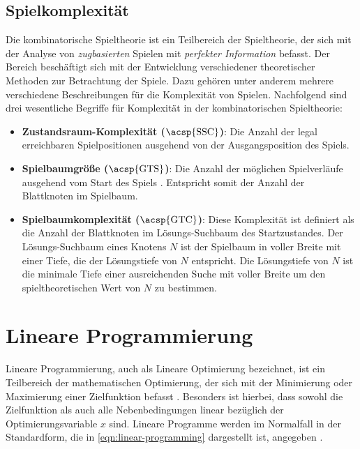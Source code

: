 \subsection{Spielkomplexität}

Die kombinatorische Spieltheorie ist ein Teilbereich der Spieltheorie, der sich mit der Analyse von \emph{zugbasierten} Spielen mit \emph{perfekter Information} befasst. Der Bereich beschäftigt sich mit der Entwicklung verschiedener theoretischer Methoden zur Betrachtung der Spiele. Dazu gehören unter anderem mehrere verschiedene Beschreibungen für die Komplexität von Spielen. Nachfolgend sind drei wesentliche Begriffe für Komplexität in der kombinatorischen Spieltheorie:

\pagebreak

\begin{itemize}
    \item \textbf{Zustandsraum-Komplexität ($\text{\acsp{SSC}}$)}: Die Anzahl der legal erreichbaren Spielpositionen ausgehend von der Ausgangsposition des Spiels. \cite[S. 106]{2007.SolvingGames}
    \item \vspace*{-0.2cm} \textbf{Spielbaumgröße ($\text{\acsp{GTS}}$)}: Die Anzahl der möglichen Spielverläufe ausgehend vom Start des Spiels \cite[S. 1]{2019.GameTreeComplexityEstimation}. Entspricht somit der Anzahl der Blattknoten im Spielbaum.
    \item \vspace*{-0.2cm} \textbf{Spielbaumkomplexität ($\text{\acsp{GTC}}$)}: Diese Komplexität ist definiert als die Anzahl der Blattknoten im Lösungs-Suchbaum des Startzustandes. Der Lösungs-Suchbaum eines Knotens $N$ ist der Spielbaum in voller Breite mit einer Tiefe, die der Lösungstiefe von $N$ entspricht. Die Lösungstiefe von $N$ ist die minimale Tiefe einer ausreichenden Suche mit voller Breite um den spieltheoretischen Wert von $N$ zu bestimmen. \cite[S. 299]{2002.GamesSolved}
\end{itemize}

\vspace*{-0.2cm}
\vspace*{-0.15cm}

\section{Lineare Programmierung}
\label{chapter:lineare-programmierung}

Lineare Programmierung, auch als Lineare Optimierung bezeichnet, ist ein Teilbereich der mathematischen Optimierung, der sich mit der Minimierung oder Maximierung einer Zielfunktion befasst \cite{2024.MathWorksLP}. Besonders ist hierbei, dass sowohl die Zielfunktion als auch alle Nebenbedingungen linear bezüglich der Optimierungsvariable $x$ sind. Lineare Programme werden im Normalfall in der Standardform, die in \ref{eqn:linear-programming} dargestellt ist, angegeben \cite[S. 6]{2023.ConvexOptimization}.


